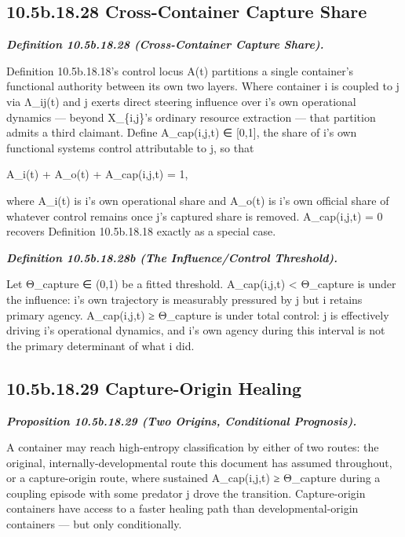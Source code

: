 \documentclass[
]{article}
\begin{document}
\hypertarget{b.18.28-cross-container-capture-share}{%
\subsection{10.5b.18.28 Cross-Container Capture
Share}\label{b.18.28-cross-container-capture-share}}

\emph{\textbf{Definition 10.5b.18.28 (Cross-Container Capture Share).}}

Definition 10.5b.18.18's control locus A(t) partitions a single
container's functional authority between its own two layers. Where
container i is coupled to j via Λ\_ij(t) and j exerts direct steering
influence over i's own operational dynamics --- beyond X\_\{i,j\}'s
ordinary resource extraction --- that partition admits a third claimant.
Define A\_cap(i,j,t) ∈ {[}0,1{]}, the share of i's own functional
systems control attributable to j, so that

A\_i(t) + A\_o(t) + A\_cap(i,j,t) = 1,

where A\_i(t) is i's own operational share and A\_o(t) is i's own
official share of whatever control remains once j's captured share is
removed. A\_cap(i,j,t) = 0 recovers Definition 10.5b.18.18 exactly as a
special case.

\emph{\textbf{Definition 10.5b.18.28b (The Influence/Control
Threshold).}}

Let Θ\_capture ∈ (0,1) be a fitted threshold. A\_cap(i,j,t) \textless{}
Θ\_capture is under the influence: i's own trajectory is measurably
pressured by j but i retains primary agency. A\_cap(i,j,t) ≥ Θ\_capture
is under total control: j is effectively driving i's operational
dynamics, and i's own agency during this interval is not the primary
determinant of what i did.

\hypertarget{b.18.29-capture-origin-healing}{%
\subsection{10.5b.18.29 Capture-Origin
Healing}\label{b.18.29-capture-origin-healing}}

\emph{\textbf{Proposition 10.5b.18.29 (Two Origins, Conditional
Prognosis).}}

A container may reach high-entropy classification by either of two
routes: the original, internally-developmental route this document has
assumed throughout, or a capture-origin route, where sustained
A\_cap(i,j,t) ≥ Θ\_capture during a coupling episode with some predator
j drove the transition. Capture-origin containers have access to a
faster healing path than developmental-origin containers --- but only
conditionally.
\end{document}
